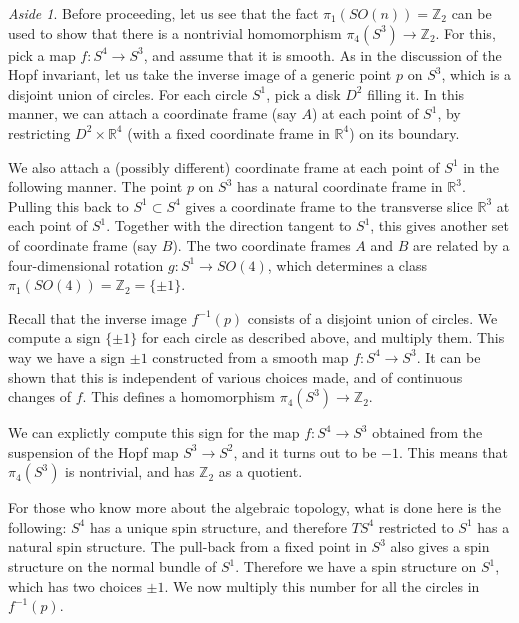 \documentclass[12pt]{article}
\numberwithin{equation}{section}
\theoremstyle{remark}
\newtheorem{aside}[definition]{Aside}
\def\bR{\mathbb{R}}
\def\bZ{\mathbb{Z}}
\begin{document}
\begin{aside}
Before proceeding, let us see that the fact $\pi_1(SO(n))=\bZ_2$ 
can be used to show that there is a nontrivial homomorphism $\pi_4(S^3) \to \bZ_2$.
For this, pick a map $f:S^4\to S^3$, and assume that it is smooth.
As in the discussion of the Hopf invariant,
let us take the inverse image of a generic point $p$ on $S^3$, which is a disjoint union of circles.
For each circle $S^1$, pick a disk $D^2$ filling it.
In this manner, we can attach a coordinate frame (say $A$) at each point of $S^1$,
by restricting $D^2 \times \bR^4$ (with a fixed coordinate frame in $\bR^4$) on its boundary.

We also attach a (possibly different) coordinate frame at each point of $S^1$ in the following manner.
The point $p$ on $S^3$ has a natural coordinate frame in $\bR^3$.
Pulling this back to $S^1\subset S^4$ gives a coordinate frame to the transverse slice $\bR^3$ at each point of $S^1$.
Together with the direction  tangent to $S^1$, 
this gives another set of coordinate frame (say $B$).
The two coordinate frames $A$ and $B$ are related by a four-dimensional rotation $g:S^1\to SO(4)$,
which determines a class $\pi_1(SO(4))=\bZ_2=\{\pm1\}$.

Recall that the inverse image $f^{-1}(p)$ consists of a disjoint union of circles.
We compute a sign $\{\pm1\}$ for each circle as described above,
and multiply them.
This way we have a sign $\pm1$ constructed from a smooth map $f:S^4\to S^3$.
It can be shown that this is independent of various choices made,
and of continuous changes of $f$.
This defines a homomorphism $\pi_4(S^3)\to \bZ_2$.

We can explictly compute this sign for the map $f:S^4\to S^3$
obtained from the suspension of the Hopf map $S^3\to S^2$,
and it turns out to be $-1$.
This means that $\pi_4(S^3)$ is nontrivial, and has $\bZ_2$ as a quotient.

For those who know more about the algebraic topology,
what is done here is the following:
$S^4$ has a unique spin structure, and therefore
$TS^4$ restricted to $S^1$  has a natural spin structure.
The pull-back from a fixed point in $S^3$ also gives a spin structure on the normal bundle of $S^1$.
Therefore we have a spin structure on $S^1$,
which has two choices $\pm1$. 
We now multiply this number for all the circles in $f^{-1}(p)$.
\end{aside}
\end{document}
